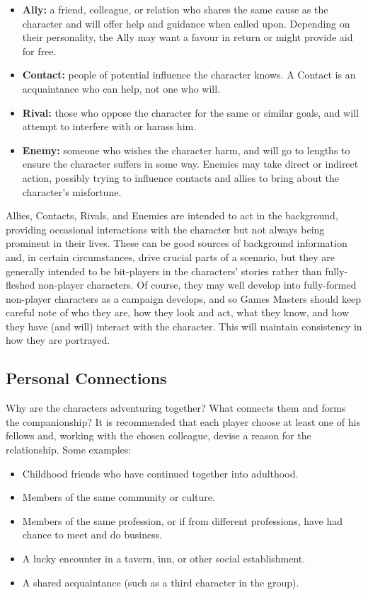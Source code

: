\documentclass[10pt]{article}
\begin{document}
\begin{itemize}
    \item \textbf{Ally:} a friend, colleague, or relation who shares the same cause as the character and will offer help and guidance when called upon. Depending on their personality, the Ally may want a favour in return or might provide aid for free.
    \item \textbf{Contact:} people of potential influence the character knows. A Contact is an acquaintance who can help, not one who will.
    \item \textbf{Rival:} those who oppose the character for the same or similar goals, and will attempt to interfere with or harass him.
    \item \textbf{Enemy:} someone who wishes the character harm, and will go to lengths to ensure the character suffers in some way. Enemies may take direct or indirect action, possibly trying to influence contacts and allies to bring about the character's misfortune.
\end{itemize}

Allies, Contacts, Rivals, and Enemies are intended to act in the background, providing occasional interactions with the character but not always being prominent in their lives. These can be good sources of background information and, in certain circumstances, drive crucial parts of a scenario, but they are generally intended to be bit-players in the characters' stories rather than fully-fleshed non-player characters. Of course, they may well develop into fully-formed non-player characters as a campaign develops, and so Games Masters should keep careful note of who they are, how they look and act, what they know, and how they have (and will) interact with the character. This will maintain consistency in how they are portrayed.

\subsection{Personal Connections}
\label{sec:personal-connections}

Why are the characters adventuring together? What connects them and forms the companionship? It is recommended that each player choose at least one of his fellows and, working with the chosen colleague, devise a reason for the relationship. Some examples:

\begin{itemize}
    \item Childhood friends who have continued together into adulthood.
    \item Members of the same community or culture.
    \item Members of the same profession, or if from different professions, have had chance to meet and do business.
    \item A lucky encounter in a tavern, inn, or other social establishment.
    \item A shared acquaintance (such as a third character in the group).
\end{itemize}
\end{document}
